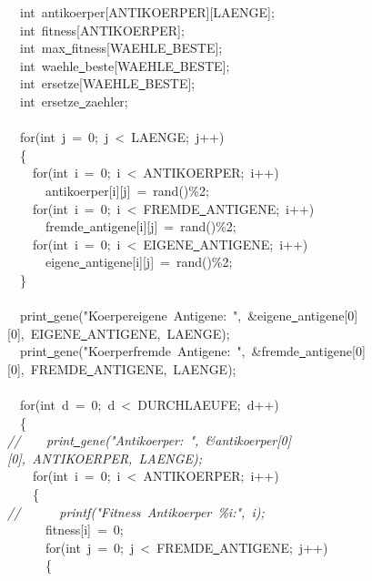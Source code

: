 {\ \ int\ antikoerper[ANTIKOERPER][LAENGE];\\
\ \ int\ fitness[ANTIKOERPER];\\
\ \ int\ max\underline\ fitness[WAEHLE\underline\ BESTE];\\
\ \ int\ waehle\underline\ beste[WAEHLE\underline\ BESTE];\\
\ \ int\ ersetze[WAEHLE\underline\ BESTE];\\
\ \ int\ ersetze\underline\ zaehler;\\
\ \\
\ \ for(int\ j\ =\ 0;\ j\ <{}\ LAENGE;\ j++)\\
\ \ \{\\
\ \ \ \ for(int\ i\ =\ 0;\ i\ <{}\ ANTIKOERPER;\ i++)\\
\ \ \ \ \ \ antikoerper[i][j]\ =\ rand()\%2;\\
\ \ \ \ for(int\ i\ =\ 0;\ i\ <{}\ FREMDE\underline\ ANTIGENE;\ i++)\\
\ \ \ \ \ \ fremde\underline\ antigene[i][j]\ =\ rand()\%2;\\
\ \ \ \ for(int\ i\ =\ 0;\ i\ <{}\ EIGENE\underline\ ANTIGENE;\ i++)\\
\ \ \ \ \ \ eigene\underline\ antigene[i][j]\ =\ rand()\%2;\\
\ \ \}\\
\ \ \\
\ \ print\underline\ gene("{}Koerpereigene\ Antigene:\ "{},\ \&eigene\underline\ antigene[0][0],\ EIGENE\underline\ ANTIGENE,\ LAENGE);\\
\ \ print\underline\ gene("{}Koerperfremde\ Antigene:\ "{},\ \&fremde\underline\ antigene[0][0],\ FREMDE\underline\ ANTIGENE,\ LAENGE);\\
\ \ \\
\ \ for(int\ d\ =\ 0;\ d\ <{}\ DURCHLAEUFE;\ d++)\\
\ \ \{\\
\textsl{//\ \ \ \ print\underline\ gene("{}Antikoerper:\ "{},\ \&antikoerper[0][0],\ ANTIKOERPER,\ LAENGE);}\\
\ \ \ \ for(int\ i\ =\ 0;\ i\ <{}\ ANTIKOERPER;\ i++)\\
\ \ \ \ \{\\
\textsl{//\ \ \ \ \ \ printf("{}Fitness\ Antikoerper\ \%i:"{},\ i);}\\
\ \ \ \ \ \ fitness[i]\ =\ 0;\\
\ \ \ \ \ \ for(int\ j\ =\ 0;\ j\ <{}\ FREMDE\underline\ ANTIGENE;\ j++)\\
\ \ \ \ \ \ \{\\
}
